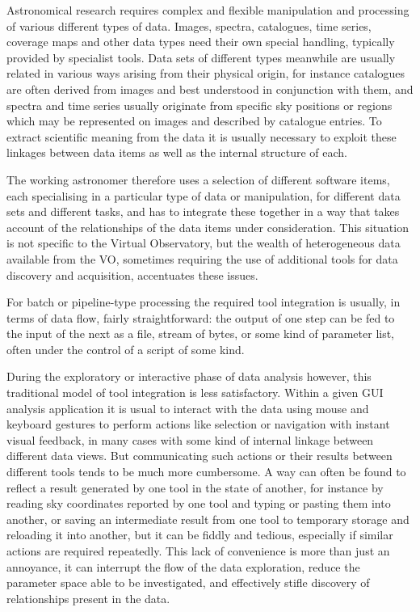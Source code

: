 \documentclass[5p]{elsarticle}
\begin{document}
Astronomical research requires complex and flexible manipulation
and processing of various different types of data.
Images, spectra, catalogues, time series, coverage maps and other data
types need their own special handling,
typically provided by specialist tools.
Data sets of different types meanwhile are usually related
in various ways arising from their physical origin,
for instance
catalogues are often derived from images and best understood in
conjunction with them, and
spectra and time series usually originate from specific sky positions
or regions which may be represented on images and described by
catalogue entries.
To extract scientific meaning from the data it is usually necessary
to exploit these linkages between data items as well as the
internal structure of each.

The working astronomer therefore uses a selection
of different software items,
each specialising in a particular type of data or manipulation,
for different data sets and different tasks,
and has to integrate these together in a way that takes account of
the relationships of the data items under consideration.
This situation is not specific to the Virtual Observatory,
but the wealth of heterogeneous data available from the VO,
sometimes requiring the use of additional tools for data discovery
and acquisition, accentuates these issues.

For batch or pipeline-type processing the required tool integration
is usually, in terms of data flow, fairly straightforward:
the output of one step can be fed to the input of the next as a file,
stream of bytes, or some kind of parameter list,
often under the control of a script of some kind.

During the exploratory or interactive phase of data analysis however,
this traditional model of tool integration is less satisfactory.
Within a given GUI analysis application
it is usual to interact with the data using
mouse and keyboard gestures to perform actions like selection or
navigation with instant visual feedback, in many cases with some
kind of internal linkage between different data views.
But communicating such actions or their results between different
tools tends to be much more cumbersome.
A way can often be found to reflect a result generated by one tool
in the state of another, for instance by reading sky coordinates
reported by one tool and typing or pasting them into another,
or saving an intermediate result from one tool to temporary storage
and reloading it into another, but it can be fiddly and tedious,
especially if similar actions are required repeatedly.
This lack of convenience is more than just an annoyance, it can
interrupt the flow of the data exploration, reduce the parameter
space able to be investigated, and effectively stifle discovery
of relationships present in the data.
\end{document}
